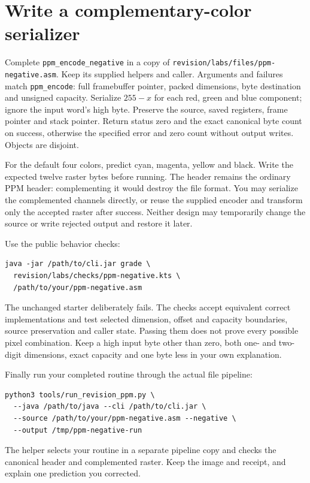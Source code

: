 \section{Write a complementary-color serializer}

Complete \texttt{ppm\_encode\_negative} in a copy of
\texttt{revision/labs/files/ppm-negative.asm}. Keep its supplied helpers and
caller. Arguments and failures match \texttt{ppm\_encode}: full framebuffer
pointer, packed dimensions, byte destination and unsigned capacity. Serialize
$255-x$ for each red, green and blue component; ignore the input word's high
byte. Preserve the source, saved registers, frame pointer and stack pointer.
Return status zero and the exact canonical byte count on success, otherwise
the specified error and zero count without output writes. Objects are disjoint.

For the default four colors, predict cyan, magenta, yellow and black. Write the
expected twelve raster bytes before running. The header remains the ordinary
PPM header: complementing it would destroy the file format. You may serialize
the complemented channels directly, or reuse the supplied encoder and transform
only the accepted raster after success. Neither design may temporarily change
the source or write rejected output and restore it later.

Use the public behavior checks:
\begin{verbatim}
java -jar /path/to/cli.jar grade \
  revision/labs/checks/ppm-negative.kts \
  /path/to/your/ppm-negative.asm
\end{verbatim}
The unchanged starter deliberately fails. The checks accept equivalent correct
implementations and test selected dimension, offset and capacity boundaries,
source preservation and caller state. Passing them does not prove every possible
pixel combination. Keep a high input byte other than zero, both one- and
two-digit dimensions, exact capacity and one byte less in your own explanation.

Finally run your completed routine through the actual file pipeline:
\begin{verbatim}
python3 tools/run_revision_ppm.py \
  --java /path/to/java --cli /path/to/cli.jar \
  --source /path/to/your/ppm-negative.asm --negative \
  --output /tmp/ppm-negative-run
\end{verbatim}
The helper selects your routine in a separate pipeline copy and checks the
canonical header and complemented raster. Keep the image and receipt, and
explain one prediction you corrected.
